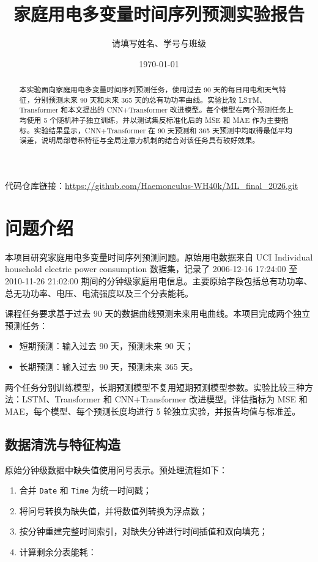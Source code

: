 \documentclass[UTF8,a4paper,12pt]{ctexart}
\title{家庭用电多变量时间序列预测实验报告}
\author{请填写姓名、学号与班级}
\date{\today}
\begin{document}
\maketitle

\begin{abstract}
本实验面向家庭用电多变量时间序列预测任务，使用过去 90 天的每日用电和天气特征，分别预测未来 90 天和未来 365 天的总有功功率曲线。实验比较 LSTM、Transformer 和本文提出的 CNN+Transformer 改进模型。每个模型在两个预测任务上均使用 5 个随机种子独立训练，并以测试集反标准化后的 MSE 和 MAE 作为主要指标。实验结果显示，CNN+Transformer 在 90 天预测和 365 天预测中均取得最低平均误差，说明局部卷积特征与全局注意力机制的结合对该任务具有较好效果。
\end{abstract}

\noindent
代码仓库链接：\url{https://github.com/Haemonculus-WH40k/ML_final_2026.git}

\section{问题介绍}

本项目研究家庭用电多变量时间序列预测问题。原始用电数据来自 UCI Individual household electric power consumption 数据集，记录了 2006-12-16 17:24:00 至 2010-11-26 21:02:00 期间的分钟级家庭用电信息。主要原始字段包括总有功功率、总无功功率、电压、电流强度以及三个分表能耗。

课程任务要求基于过去 90 天的数据曲线预测未来用电曲线。本项目完成两个独立预测任务：

\begin{itemize}
  \item 短期预测：输入过去 90 天，预测未来 90 天；
  \item 长期预测：输入过去 90 天，预测未来 365 天。
\end{itemize}

两个任务分别训练模型，长期预测模型不复用短期预测模型参数。实验比较三种方法：LSTM、Transformer 和 CNN+Transformer 改进模型。评估指标为 MSE 和 MAE，每个模型、每个预测长度均进行 5 轮独立实验，并报告均值与标准差。

\subsection*{数据清洗与特征构造}

原始分钟级数据中缺失值使用问号表示。预处理流程如下：

\begin{enumerate}
  \item 合并 \texttt{Date} 和 \texttt{Time} 为统一时间戳；
  \item 将问号转换为缺失值，并将数值列转换为浮点数；
  \item 按分钟重建完整时间索引，对缺失分钟进行时间插值和双向填充；
  \item 计算剩余分表能耗：
\end{enumerate}
\end{document}
